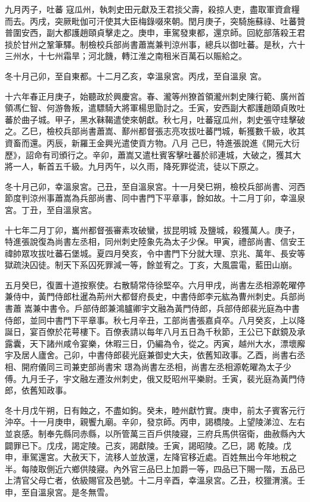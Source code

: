 \begin{pinyinscope}
 九月丙子，吐蕃
 寇瓜州，執刺史田元獻及王君掞父壽，殺掠人吏，盡取軍資倉糧而去。丙戌，突厥毗伽可汗使其大臣梅錄啜來朝。閏月庚子，突騎施蘇祿、吐蕃贊普圍安西，副大都護趙頤貞擊走之。庚申，車駕發東都，還京師。回紇部落殺王君掞於甘州之鞏筆驛。制檢校兵部尚書蕭嵩兼判涼州事，總兵以御吐蕃。是秋，六十三州水，十七州霜旱；河北饑，轉江淮之南租米百萬石以賑給之。



 冬十月己卯，至自東都。十二月乙亥，幸溫泉宮。丙戌，至自溫泉
 宮。



 十六年春正月庚子，始聽政於興慶宮。春、瀧等州獠首領瀧州刺史陳行範、廣州首領馮仁智、何游魯叛，遣驃騎大將軍楊思勖討之。壬寅，安西副大都護趙頤貞敗吐蕃於曲子城。甲子，黑水靺鞨遣使來朝獻。秋七月，吐蕃寇瓜州，刺史張守珪擊破之。乙巳，檢校兵部尚書蕭嵩、鄯州都督張志亮攻拔吐蕃門城，斬獲數千級，收其資畜而還。丙辰，新羅王金興光遣使貢方物。八月
 己巳，特進張說進《開元大衍歷》，詔命有司頒行之。辛卯，蕭嵩又遣杜賓客擊吐蕃於祁連城，大破之，獲其大將一人，斬首五千級。九月丙午，以久雨，降死罪從流，徒以下原之。



 冬十月己卯，幸溫泉宮。己丑，至自溫泉宮。十一月癸巳朔，檢校兵部尚書、河西節度判涼州事蕭嵩為兵部尚書、同中書門下平章事，餘如故。十二月丁卯，幸溫泉宮。丁丑，至自溫泉宮。



 十七年二月丁卯，巂州都督張審素攻破蠻，拔昆明城
 及鹽城，殺獲萬人。庚子，特進張說復為尚書左丞相，同州刺史陸象先為太子少保。甲寅，禮部尚書、信安王禕帥眾攻拔吐蕃石堡城。夏四月癸亥，令中書門下分就大理、京兆、萬年、長安等獄疏決囚徒。制天下系囚死罪減一等，餘並宥之。丁亥，大風震電，藍田山崩。



 五月癸巳，復置十道按察使。右散騎常侍徐堅卒。六月甲戌，尚書左丞相源乾曜停兼侍中，黃門侍郎杜暹為荊州大都督府長史，中書侍郎李元紘為曹州刺史。兵部尚書蕭
 嵩兼中書令。戶部侍郎兼鴻臚卿宇文融為黃門侍郎，兵部侍郎裴光庭為中書侍郎，並同中書門下平章事。秋七月辛丑，工部尚書張嘉貞卒。八月癸亥，上以降誕日，宴百僚於花萼樓下。百僚表請以每年八月五日為千秋節，王公已下獻鏡及承露囊，天下諸州咸令宴樂，休暇三日，仍編為令，從之。丙寅，越州大水，漂壞廨宇及居人廬舍。己卯，中書侍郎裴光庭兼御史大夫，依舊知政事。乙酉，尚書右丞相、開府儀同三司兼吏部尚書宋
 璟為尚書左丞相，尚書左丞相源乾曜為太子少傅。九月壬子，宇文融左遷汝州刺史，俄又貶昭州平樂尉。壬寅，裴光庭為黃門侍郎，依舊知政事。



 冬十月戊午朔，日有蝕之，不盡如鉤。癸未，睦州獻竹實。庚申，前太子賓客元行沖卒。十一月庚申，親饗九廟。辛卯，發京師。丙申，謁橋陵。上望陵涕泣、左右並哀感。制奉先縣同赤縣，以所管萬三百戶供陵寢，三府兵馬供宿衛，曲赦縣內大闢罪已下。戊戌，謁定陵。己亥，謁獻陵。壬寅，謁昭陵。乙巳，謁
 乾陵。戊申，車駕還宮。大赦天下，流移人並放還，左降官移近處。百姓無出今年地稅之半。每陵取側近六鄉供陵寢。內外官三品巳上加爵一等，四品已下賜一階，五品已上清官父母亡者，依級賜官及邑號。十二月辛酉，幸溫泉宮。乙丑，校獵渭濱。壬申，至自溫泉宮。是冬無雪。




\end{pinyinscope}
